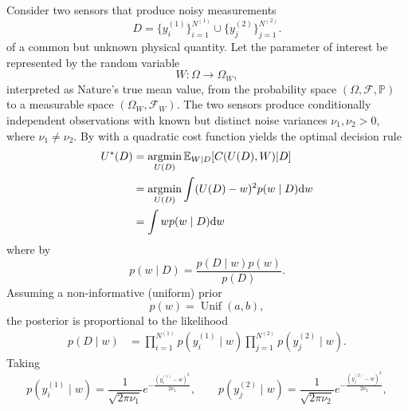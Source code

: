 \begin{example}
	\label{ex:heteroscedastic_bayes}
	Consider two sensors that produce noisy measurements
	\begin{equation}
		D = \{ y_i^{(1)} \}_{i=1}^{N^{(1)}} \cup \{ y_j^{(2)} \}_{j=1}^{N^{(2)}}.
	\end{equation}
	of a common but unknown physical quantity. Let the parameter of interest be represented by the random variable
	\begin{equation}
		W\colon \Omega \to \Omega_W,
	\end{equation}
	interpreted as Nature’s true mean value, from the probability space $(\Omega, \mathcal{F}, \mathbb{P})$ to a measurable space $(\Omega_W,\mathcal{F}_W)$. The two sensors produce conditionally independent observations with known but distinct noise variances $\nu_1, \nu_2 > 0$, where $\nu_1 \neq \nu_2$. By  with a quadratic cost function yields the optimal decision rule 
	\begin{equation}
		\begin{split}
			U^*(D) &=\operatorname*{argmin}_{U(D)}\mathbb{E}_{W|D}[C(U(D), W)|D]\\
			&= \operatorname*{argmin}_{U(D)}\int (U(D) - w)^2p(w\mid D) \mathrm{d}w \\
			&= \int w p(w\mid D) \mathrm{d}w
		\end{split}
		\label{eq:deci}
	\end{equation}
	where by 
	\begin{equation}
		p(w \mid D)
		= \frac{p(D \mid w)p(w)}
		{p(D)}.
		\label{eq:hetero_posterior}
	\end{equation}
	Assuming a non-informative (uniform) prior 
	\begin{equation}
		p(w) = \operatorname{Unif}(a,b),
	\end{equation}
	the posterior is proportional to the likelihood
	\begin{equation}
		\begin{split}
			p(D \mid w)
			&= \prod_{i=1}^{N^{(1)}} p(y_i^{(1)}\mid w)
			\prod_{j=1}^{N^{(2)}} p(y_j^{(2)}\mid w).
		\end{split}
	\end{equation}
	Taking 
	\begin{equation}
		p(y_i^{(1)}\mid w) = \frac{1}{\sqrt{2\pi\nu_1}}
		e^{-\frac{(y_i^{(1)} - w)^2}{2\nu_1}},
		\qquad
		p(y_j^{(2)}\mid w) = \frac{1}{\sqrt{2\pi\nu_2}}
		e^{-\frac{(y_j^{(2)} - w)^2}{2\nu_2}},
	\end{equation}

\end{example}
